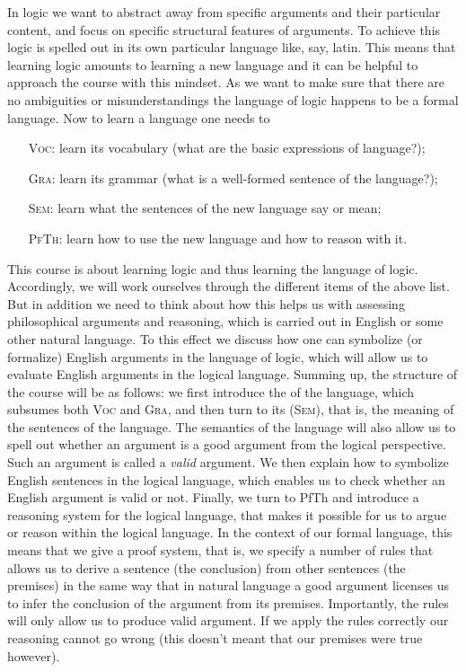 In logic we want to abstract away from specific arguments and their particular content, and focus on specific structural features of arguments. To achieve this  logic is spelled out in its own particular language like, say, latin.  This means that learning logic amounts to learning a new language and it can be helpful to approach the course with this mindset. As we want to make sure that there are no ambiguities or misunderstandings the language of logic happens to be a formal language. Now to learn a language one needs to
\begin{itemize}
\item[\textsc{Voc}:]\label{vocInt} learn its vocabulary (what are the basic expressions of language?);
\item[\textsc{Gra}:]\label{graInt} learn its grammar (what is a well-formed sentence of the language?);
\item[\textsc{Sem}:]\label{semInt} learn what the sentences of the new language say or mean;
\item[\textsc{PfTh}:]\label{ptInt} learn how to use the new language and how to reason with it.
\end{itemize}

This course is about learning logic and thus learning the language of logic. Accordingly, we will work ourselves through the different items of the above list. But in addition we need to think about how this helps us with assessing philosophical arguments and reasoning, which is carried out in English or some other natural language. To this effect we discuss how one can symbolize (or formalize) English arguments in the language of logic, which will allow us to evaluate English arguments in the logical language. Summing up, the structure of the course will be as follows: we first introduce the  of the language, which subsumes both \textsc{Voc} and \textsc{Gra}, and then turn to its  (\textsc{Sem}), that is, the meaning of the sentences of the language. The semantics of the language will also allow us to spell out whether an argument is a good argument from the logical perspective. Such an argument is called a \emph{valid} argument.  We then explain how to symbolize English sentences in the logical language, which enables us to check whether an English argument is valid or not. Finally, we turn to PfTh and introduce a reasoning system for the logical language, that makes it possible for us to argue or reason within the logical language. In the context of our formal language, this means that we give a proof system, that is, we specify a number of rules that allows us to derive a sentence (the conclusion) from other sentences (the premises) in the same way that in natural language a good argument licenses us to infer the conclusion of the argument from its premises. Importantly, the rules will only allow us to produce valid argument. If we apply the rules correctly our reasoning cannot go wrong (this doesn't meant that our premises were true however).

